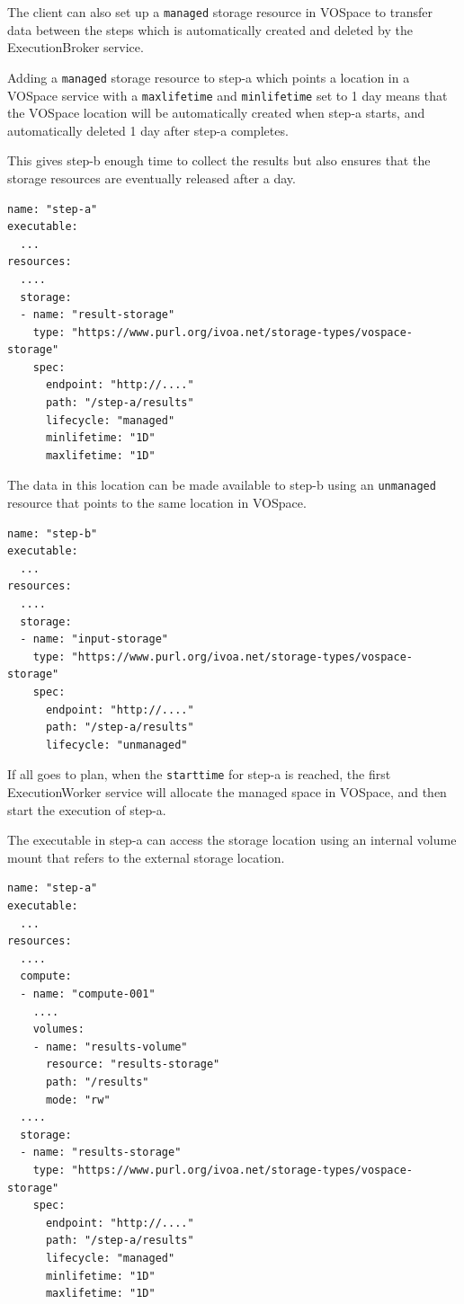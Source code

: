 \documentclass[11pt,a4paper]{ivoa}
\newcommand{\vospace} {VOSpace}
\newcommand{\execbrokerclass} {ExecutionBroker}
\newcommand{\execworkerclass} {ExecutionWorker}
\newcommand{\codeword}[1] {\texttt{#1}}
\begin{document}
The client can also set up a \codeword{managed} storage resource in \vospace{} to transfer data
between the steps which is automatically created and deleted by the \execbrokerclass{} service.

Adding a \codeword{managed} storage resource to step-a which points a location in a \vospace{} service
with a \codeword{maxlifetime} and \codeword{minlifetime} set to 1 day means that the \vospace{} location
will be automatically created when step-a starts, and automatically deleted 1 day after step-a completes.

This gives step-b enough time to collect the results but also ensures that the storage resources
are eventually released after a day.

\begin{lstlisting}[]
name: "step-a"
executable:
  ...
resources:
  ....
  storage:
  - name: "result-storage"
    type: "https://www.purl.org/ivoa.net/storage-types/vospace-storage"
    spec:
      endpoint: "http://...."
      path: "/step-a/results"
      lifecycle: "managed"
      minlifetime: "1D"
      maxlifetime: "1D"
\end{lstlisting}

The data in this location can be made available to step-b using an \codeword{unmanaged} resource
that points to the same location in \vospace{}.

\begin{lstlisting}[]
name: "step-b"
executable:
  ...
resources:
  ....
  storage:
  - name: "input-storage"
    type: "https://www.purl.org/ivoa.net/storage-types/vospace-storage"
    spec:
      endpoint: "http://...."
      path: "/step-a/results"
      lifecycle: "unmanaged"
\end{lstlisting}

If all goes to plan, when the \codeword{starttime} for step-a is reached,
the first \execworkerclass{} service will allocate the managed space in \vospace{},
and then start the execution of step-a.

The executable in step-a can access the storage location using an internal
volume mount that refers to the external storage location.

\begin{lstlisting}[]
name: "step-a"
executable:
  ...
resources:
  ....
  compute:
  - name: "compute-001"
    ....
    volumes:
    - name: "results-volume"
      resource: "results-storage"
      path: "/results"
      mode: "rw"
  ....
  storage:
  - name: "results-storage"
    type: "https://www.purl.org/ivoa.net/storage-types/vospace-storage"
    spec:
      endpoint: "http://...."
      path: "/step-a/results"
      lifecycle: "managed"
      minlifetime: "1D"
      maxlifetime: "1D"
\end{lstlisting}
\end{document}
